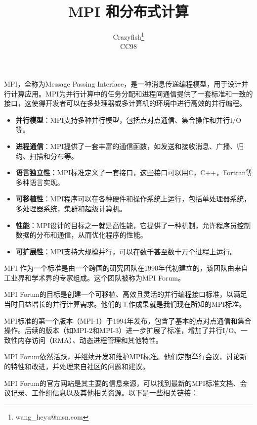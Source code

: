 \documentclass{ctexart}
\title{MPI 和分布式计算}
\author{Crazyfish\footnote{wang\_heyu@msn.com} \\ CC98}
\date{}
\begin{document}
\maketitle

MPI，全称为Message Passing Interface，是一种消息传递编程模型，用于设计并行计算应用。MPI为并行计算中的任务分配和进程间通信提供了一套标准和一致的接口，这使得开发者可以在多处理器或多计算机的环境中进行高效的并行编程。  
  
\begin{itemize}  
    \item \textbf{并行模型}：MPI支持多种并行模型，包括点对点通信、集合操作和并行I/O等。  
    \item \textbf{进程通信}：MPI提供了一套丰富的通信函数，如发送和接收消息、广播、归约、扫描和分布等。  
    \item \textbf{语言独立性}：MPI标准定义了一套接口，这些接口可以用C，C++，Fortran等多种语言实现。  
    \item \textbf{可移植性}：MPI程序可以在各种硬件和操作系统上运行，包括单处理器系统，多处理器系统，集群和超级计算机。  
    \item \textbf{性能}：MPI设计的目标之一就是高性能，它提供了一种机制，允许程序员控制数据的分布和通信，从而优化程序的性能。  
    \item \textbf{可扩展性}：MPI支持大规模并行，可以在数千甚至数十万个进程上运行。  
\end{itemize}  
  
MPI 作为一个标准是由一个跨国的研究团队在1990年代初建立的，该团队由来自工业界和学术界的专家组成。这个团队被称为MPI Forum。

MPI Forum的目标是创建一个可移植、高效且灵活的并行编程接口标准，以满足当时日益增长的并行计算需求。他们的工作成果就是我们现在所知的MPI标准。

MPI标准的第一个版本（MPI-1）于1994年发布，包含了基本的点对点通信和集合操作。后续的版本（如MPI-2和MPI-3）进一步扩展了标准，增加了并行I/O、一致性内存访问（RMA）、动态进程管理和其他特性。

MPI Forum依然活跃，并继续开发和维护MPI标准。他们定期举行会议，讨论新的特性和改进，并处理来自社区的问题和建议。

MPI Forum的官方网站是其主要的信息来源，可以找到最新的MPI标准文档、会议记录、工作组信息以及其他相关资源。以下是一些相关链接：  
  
\end{document}
